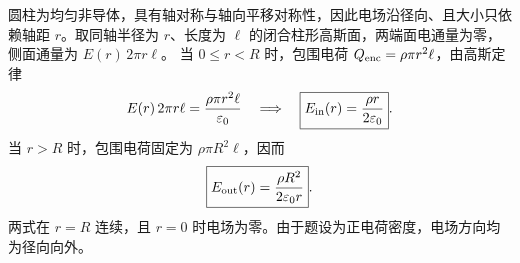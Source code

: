圆柱为均匀非导体，具有轴对称与轴向平移对称性，因此电场沿径向、且大小只依赖轴距 $r$。取同轴半径为 $r$、长度为 $\ell$ 的闭合柱形高斯面，两端面电通量为零，侧面通量为 $E(r)\,2\pi r\ell$。
当 $0\leq r<R$ 时，包围电荷 $Q_{\rm enc}=\rho\pi r^2\ell$，由高斯定律
\[
E(r)\,2\pi r\ell=\frac{\rho\pi r^2\ell}{\varepsilon_0}
\quad\Longrightarrow\quad
\boxed{E_{\rm in}(r)=\frac{\rho r}{2\varepsilon_0}}.
\]
当 $r>R$ 时，包围电荷固定为 $\rho\pi R^2\ell$，因而
\[
\boxed{E_{\rm out}(r)=\frac{\rho R^2}{2\varepsilon_0r}}.
\]
两式在 $r=R$ 连续，且 $r=0$ 时电场为零。由于题设为正电荷密度，电场方向均为径向向外。
